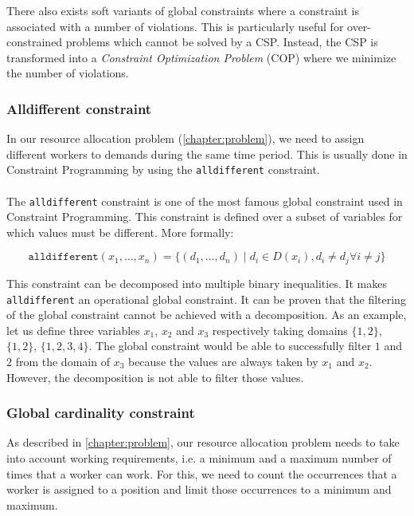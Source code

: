 \documentclass[../../thesis.tex]{subfiles}
\begin{document}
There also exists soft variants \cite{Regin:2000} of global constraints where a constraint is associated with 
a number of violations. This is particularly useful for over-constrained problems which cannot be solved by a CSP.
Instead, the CSP is transformed into a \emph{Constraint Optimization Problem} (COP) where we minimize the number of violations.
\subsubsection{Alldifferent constraint}
\label{sota:alldifferent}

In our resource allocation problem (\ref{chapter:problem}), we need to assign different workers to demands during the same time period. 
This is usually done in Constraint Programming by using the \texttt{alldifferent} constraint.

\paragraph{}

The \texttt{alldifferent} constraint \cite{Rgin1994AFA} is one of the most famous global constraint used in Constraint 
Programming.
This constraint is defined over a subset of variables for which values must be different. More formally:

\begin{equation*}
  \texttt{alldifferent}(x_1, \dots, x_n) = \{ (d_1, \dots, d_n) \mid d_i \in D(x_i), d_i \neq d_j \forall i \neq j \}
\end{equation*}

This constraint can be decomposed into multiple binary inequalities. It makes \texttt{alldifferent} an operational global constraint.
It can be proven that the filtering of the global constraint cannot be achieved with a decomposition. As 
an example, let us define three variables $x_1$, $x_2$ and $x_3$ respectively taking domains $\{1,2\}$, $\{1,2\}$, $\{1,2,3,4\}$. 
The global constraint would be able to successfully filter $1$ and $2$ from the domain of 
$x_3$ because the values are always taken by $x_1$ and $x_2$. However, the decomposition is not able to filter those values.


\subsubsection{Global cardinality constraint}
\label{sota:gcc}

As described in \autoref{chapter:problem}, our resource allocation problem needs to take into account working requirements, i.e. a minimum 
and a maximum number of times that a worker can work. For this, we need to count the occurrences that a worker is assigned to a position and 
limit those occurrences to a minimum and maximum. 
\end{document}
